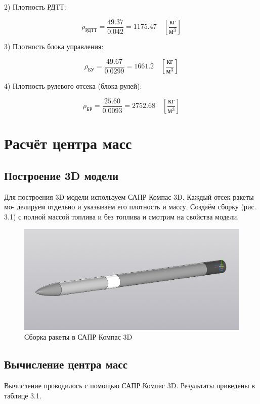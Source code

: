 \documentclass[a4paper,12pt]{report}
\begin{document}
2) Плотность РДТТ:

\[ \rho_{\text{РДТТ}} = \frac{49.37}{0.042} = 1175.47 \quad \left[\frac{\text{кг}}{\text{м}^3}\right]\]

3) Плотность блока управления:

\[ \rho_{\text{БУ}} = \frac{49.67}{0.0299} = 1661.2 \quad \left[\frac{\text{кг}}{\text{м}^3}\right]\]

4) Плотность рулевого отсека (блока рулей):

\[ \rho_{\text{БР}} = \frac{25.60}{0.0093} = 2752.68 \quad \left[\frac{\text{кг}}{\text{м}^3}\right]\]


\chapter{Расчёт центра масс}

\section{Построение 3D модели}

Для построения 3D модели используем САПР Компас 3D. Каждый отсек ракеты мо-
делируем отдельно и указываем его плотность и массу. Создаём сборку (рис. 3.1) с полной
массой топлива и без топлива и смотрим на свойства модели.

\begin{figure}[h]
\centering
\includegraphics[width=0.65\textheight]{images/6.jpg}
\caption{Сборка ракеты в САПР Компас 3D}
\label{AIM-120}
\end{figure}

\section{Вычисление центра масс}

Вычисление проводилось с помощью САПР Компас 3D. Результаты приведены в таблице 3.1.
\end{document}
